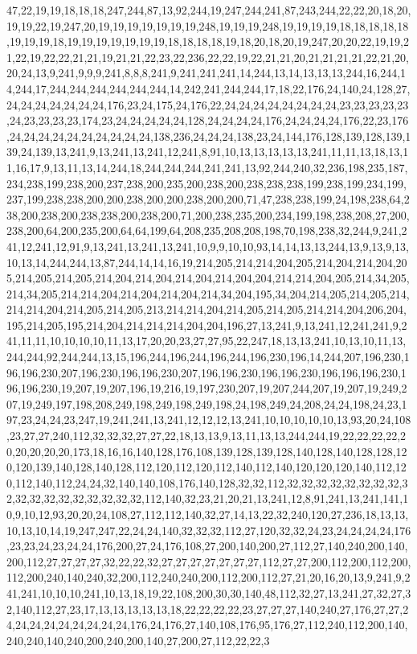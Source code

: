 47,22,19,19,18,18,18,247,244,87,13,92,244,19,247,244,241,87,243,244,22,22,20,18,20,19,19,22,19,247,20,19,19,19,19,19,19,19,248,19,19,19,248,19,19,19,19,18,18,18,18,18,19,19,19,18,19,19,19,19,19,19,19,18,18,18,18,19,18,20,18,20,19,247,20,20,22,19,19,21,22,19,22,22,21,21,19,21,21,22,23,22,236,22,22,19,22,21,21,20,21,21,21,21,22,21,20,20,24,13,9,241,9,9,9,241,8,8,8,241,9,241,241,241,14,244,13,14,13,13,13,244,16,244,14,244,17,244,244,244,244,244,244,14,242,241,244,244,17,18,22,176,24,140,24,128,27,24,24,24,24,24,24,24,176,23,24,175,24,176,22,24,24,24,24,24,24,24,24,23,23,23,23,23,24,23,23,23,23,174,23,24,24,24,24,24,128,24,24,24,24,176,24,24,24,24,176,22,23,176,24,24,24,24,24,24,24,24,24,24,138,236,24,24,24,138,23,24,144,176,128,139,128,139,139,24,139,13,241,9,13,241,13,241,12,241,8,91,10,13,13,13,13,13,241,11,11,13,18,13,11,16,17,9,13,11,13,14,244,18,244,244,244,241,241,13,92,244,240,32,236,198,235,187,234,238,199,238,200,237,238,200,235,200,238,200,238,238,238,199,238,199,234,199,237,199,238,238,200,200,238,200,200,238,200,200,71,47,238,238,199,24,198,238,64,238,200,238,200,238,238,200,238,200,71,200,238,235,200,234,199,198,238,208,27,200,238,200,64,200,235,200,64,64,199,64,208,235,208,208,198,70,198,238,32,244,9,241,241,12,241,12,91,9,13,241,13,241,13,241,10,9,9,10,10,93,14,14,13,13,244,13,9,13,9,13,10,13,14,244,244,13,87,244,14,14,16,19,214,205,214,214,204,205,214,204,214,204,205,214,205,214,205,214,204,214,204,214,204,214,204,204,214,214,204,205,214,34,205,214,34,205,214,214,204,214,204,214,204,214,34,204,195,34,204,214,205,214,205,214,214,214,204,214,205,214,205,213,214,214,204,214,205,214,205,214,214,204,206,204,195,214,205,195,214,204,214,214,214,204,204,196,27,13,241,9,13,241,12,241,241,9,241,11,11,10,10,10,10,11,13,17,20,20,23,27,27,95,22,247,18,13,13,241,10,13,10,11,13,244,244,92,244,244,13,15,196,244,196,244,196,244,196,230,196,14,244,207,196,230,196,196,230,207,196,230,196,196,230,207,196,196,230,196,196,230,196,196,196,230,196,196,230,19,207,19,207,196,19,216,19,197,230,207,19,207,244,207,19,207,19,249,207,19,249,197,198,208,249,198,249,198,249,198,24,198,249,24,208,24,24,198,24,23,197,23,24,24,23,247,19,241,241,13,241,12,12,12,13,241,10,10,10,10,10,13,93,20,24,108,23,27,27,240,112,32,32,32,27,27,22,18,13,13,9,13,11,13,13,244,244,19,22,22,22,22,20,20,20,20,20,173,18,16,16,140,128,176,108,139,128,139,128,140,128,140,128,128,120,120,139,140,128,140,128,112,120,112,120,112,140,112,140,120,120,120,140,112,120,112,140,112,24,24,32,140,140,108,176,140,128,32,32,112,32,32,32,32,32,32,32,32,32,32,32,32,32,32,32,32,32,32,112,140,32,23,21,20,21,13,241,12,8,91,241,13,241,141,10,9,10,12,93,20,20,24,108,27,112,112,140,32,27,14,13,22,32,240,120,27,236,18,13,13,10,13,10,14,19,247,247,22,24,24,140,32,32,32,112,27,120,32,32,24,23,24,24,24,24,176,23,23,24,23,24,24,176,200,27,24,176,108,27,200,140,200,27,112,27,140,240,200,140,200,112,27,27,27,27,32,22,22,32,27,27,27,27,27,27,27,112,27,27,200,112,200,112,200,112,200,240,140,240,32,200,112,240,240,200,112,200,112,27,21,20,16,20,13,9,241,9,241,241,10,10,10,241,10,13,18,19,22,108,200,30,30,140,48,112,32,27,13,241,27,32,27,32,140,112,27,23,17,13,13,13,13,13,18,22,22,22,22,23,27,27,27,140,240,27,176,27,27,24,24,24,24,24,24,24,24,24,176,24,176,27,140,108,176,95,176,27,112,240,112,200,140,240,240,140,240,200,240,200,140,27,200,27,112,22,22,3